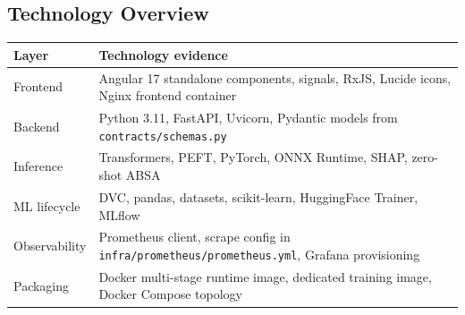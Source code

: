 \subsection{Technology Overview}
\begin{table}[H]
\centering
\begin{tabularx}{\textwidth}{@{}lX@{}}
\toprule
\textbf{Layer} & \textbf{Technology evidence} \\
\midrule
Frontend & Angular 17 standalone components, signals, RxJS, Lucide icons, Nginx frontend container \\
Backend & Python 3.11, FastAPI, Uvicorn, Pydantic models from \texttt{contracts/schemas.py} \\
Inference & Transformers, PEFT, PyTorch, ONNX Runtime, SHAP, zero-shot ABSA \\
ML lifecycle & DVC, pandas, datasets, scikit-learn, HuggingFace Trainer, MLflow \\
Observability & Prometheus client, scrape config in \texttt{infra/prometheus/prometheus.yml}, Grafana provisioning \\
Packaging & Docker multi-stage runtime image, dedicated training image, Docker Compose topology \\
\bottomrule
\end{tabularx}
\end{table}

